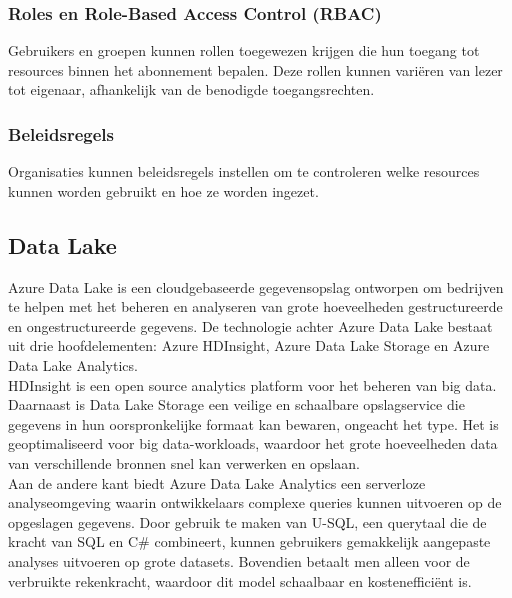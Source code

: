 \subsubsection{Roles en Role-Based Access Control (RBAC)}

Gebruikers en groepen kunnen rollen toegewezen krijgen die hun toegang tot resources binnen het abonnement bepalen. Deze rollen kunnen variëren van lezer tot eigenaar, afhankelijk van de benodigde toegangsrechten.~\autocite{Microsoft2024e}

\subsubsection{Beleidsregels}

Organisaties kunnen beleidsregels instellen om te controleren welke resources kunnen worden gebruikt en hoe ze worden ingezet.~\autocite{Microsoft2024f}

\subsection{Data Lake}

Azure Data Lake is een cloudgebaseerde gegevensopslag ontworpen om bedrijven te helpen met het beheren en analyseren van grote hoeveelheden gestructureerde en ongestructureerde gegevens. De technologie achter Azure Data Lake bestaat uit drie hoofdelementen: Azure HDInsight, Azure Data Lake Storage en Azure Data Lake Analytics.~\autocite{Awati2023a}\\

HDInsight is een open source analytics platform voor het beheren van big data.~\autocite{Awati2023a}\\

Daarnaast is Data Lake Storage een veilige en schaalbare opslagservice die gegevens in hun oorspronkelijke formaat kan bewaren, ongeacht het type. Het is geoptimaliseerd voor big data-workloads, waardoor het grote hoeveelheden data van verschillende bronnen snel kan verwerken en opslaan.~\autocite{Awati2023a}\\

Aan de andere kant biedt Azure Data Lake Analytics een serverloze analyseomgeving waarin ontwikkelaars complexe queries kunnen uitvoeren op de opgeslagen gegevens. Door gebruik te maken van U-SQL, een querytaal die de kracht van SQL en C\# combineert, kunnen gebruikers gemakkelijk aangepaste analyses uitvoeren op grote datasets. Bovendien betaalt men alleen voor de verbruikte rekenkracht, waardoor dit model schaalbaar en kostenefficiënt is.~\autocite{Awati2023a}\\

